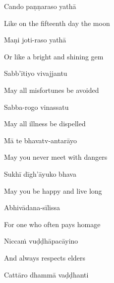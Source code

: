 Cando paṇṇaraso yathā

\begin{english}
  Like on the fifteenth day the moon
\end{english}

Maṇi joti-raso yathā\hyperlink{endnote115-appendix}{\hypertarget{endnote115-body}{}}

\begin{english}
  Or like a bright and shining gem\\
\end{english}

Sabb'ītiyo vivajjantu\hyperlink{endnote116-appendix}{\hypertarget{endnote116-body}{}}

\begin{english}
  May all misfortunes be avoided
\end{english}

Sabba-rogo vinassatu

\begin{english}
  May all illness be dispelled
\end{english}

Mā te bhavatv-antarāyo

\begin{english}
  May you never meet with dangers
\end{english}

Sukhī dīgh'āyuko bhava

\begin{english}
  May you be happy and live long
\end{english}

Abhivādana-sīlissa

\begin{english}
  For one who often pays homage
\end{english}

Niccaṁ vuḍḍhāpacāyino

\begin{english}
  And always respects elders
\end{english}

Cattāro dhammā vaḍḍhanti

